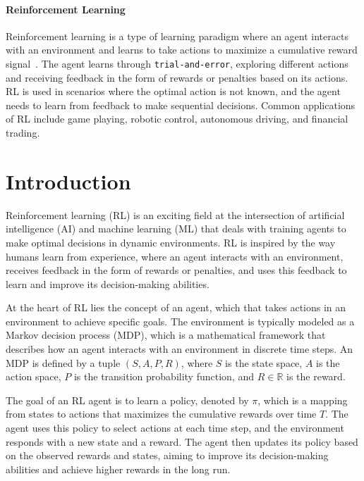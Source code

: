 \documentclass[../chapters.tex]{subfiles}
\begin{document}
    \paragraph{Reinforcement Learning}
    Reinforcement learning is a type of learning paradigm where an agent interacts with an environment and learns to take actions to maximize a cumulative reward signal~\cite{sutton2018reinforcement}.
    The agent learns through \texttt{trial-and-error}, exploring different actions and receiving feedback in the form of rewards or penalties based on its actions.
    RL is used in scenarios where the optimal action is not known, and the agent needs to learn from feedback to make sequential decisions.
    Common applications of RL include game playing, robotic control, autonomous driving, and financial trading.


    \section{Introduction}\label{sec:rl-introduction}
    Reinforcement learning (RL) is an exciting field at the intersection of artificial intelligence (AI) and machine learning (ML) that deals with training agents to make optimal decisions in dynamic environments.
    RL is inspired by the way humans learn from experience, where an agent interacts with an environment, receives feedback in the form of rewards or penalties, and uses this feedback to learn and improve its decision-making abilities.

    At the heart of RL lies the concept of an agent, which that takes actions in an environment to achieve specific goals.
    The environment is typically modeled as a Markov decision process (MDP), which is a mathematical framework that describes how an agent interacts with an environment in discrete time steps.
    An MDP is defined by a tuple $(S, A, P, R)$, where $S$ is the state space, $A$ is the action space, $P$ is the transition probability function, and $R\in\mathbb{R}$ is the reward.

    The goal of an RL agent is to learn a policy, denoted by $\pi$, which is a mapping from states to actions that maximizes the cumulative rewards over time $T$.
    The agent uses this policy to select actions at each time step, and the environment responds with a new state and a reward.
    The agent then updates its policy based on the observed rewards and states, aiming to improve its decision-making abilities and achieve higher rewards in the long run.
\end{document}
